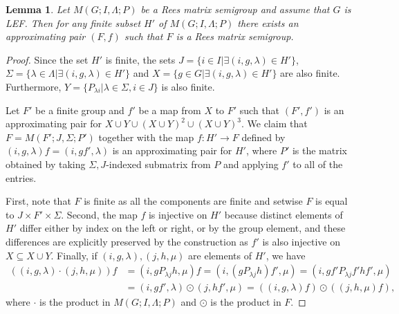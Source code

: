 \documentclass{article}
\newtheorem{lemma}{Lemma}
\theoremstyle{definition}
\begin{document}
\begin{lemma}\label{lem_compsimp}
Let $M(G; I, \Lambda; P)$ be a Rees matrix semigroup and assume that $G$ is LEF. Then for any finite subset $H'$ of $M(G; I, \Lambda; P)$ there exists an approximating pair $(F, f)$ such that $F$ is a Rees matrix semigroup. 
\end{lemma}
\begin{proof}
Since the set $H'$ is finite, the sets $J = \{ i \in I | \exists (i,g,\lambda) \in H' \}$, $\Sigma = \{\lambda \in \Lambda | \exists (i,g,\lambda) \in H' \}$ and $X = \{g \in G | \exists (i,g,\lambda) \in H' \}$ are also finite. Furthermore, $Y = \{P_{\lambda i} | \lambda \in \Sigma, i \in J\}$ is also finite.

Let $F'$ be a finite group and $f'$ be a map from $X$ to $F'$ such that $(F',f')$ is an approximating pair for $X \cup Y \cup (X \cup Y)^2 \cup (X \cup Y)^3$. We claim that $F = M(F'; J, \Sigma; P')$ together with the map $f: H' \rightarrow F$ defined by $(i,g,\lambda) f  = (i, g f' ,\lambda)$ is an approximating pair for $H'$, where $P'$ is the matrix obtained by taking $\Sigma, J$-indexed submatrix from $P$ and applying $f'$ to all of the entries.

First, note that $F$ is finite as all the components are finite and setwise $F$ is equal to $J \times F' \times \Sigma$. Second, the map $f$ is injective on $H'$ because distinct elements of $H'$ differ either by index on the left or right, or by the group element, and these differences are explicitly preserved by the construction as $f'$ is also injective on $X \subseteq X \cup Y$. Finally, if $(i,g,\lambda), (j, h, \mu)$ are elements of $H'$, we have 
\begin{align*}
((i,g,\lambda) \cdot (j, h, \mu))f  & =  (i,g P_{\lambda j} h,\mu) f = (i,(g P_{\lambda j} h) f',\mu) = (i,gf' P_{\lambda j} f' h f',\mu)  \\
 & =  (i,g f',\lambda) \odot (j, h f', \mu) = ((i,g ,\lambda)f ) \odot ((j, h , \mu) f),
\end{align*}
where $\cdot$ is the product in $M(G; I, \Lambda; P)$ and $\odot$ is the product in $F$.
\end{proof}
\end{document}
